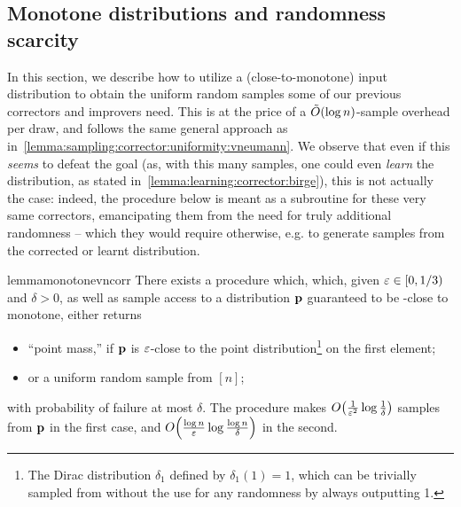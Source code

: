 \subsection{Monotone distributions and randomness scarcity}\label{sec:monotonicity:extract}
		In this section, we describe how to utilize a (close-to-monotone) input distribution to obtain the uniform random samples some of our previous correctors and improvers need. This is at the price of a $\tildeO{\log n}$-sample overhead per draw, and follows the same general approach as in~\cref{lemma:sampling:corrector:uniformity:vneumann}. We observe that even if this \emph{seems} to defeat the goal (as, with this many samples, one could even \emph{learn} the distribution, as stated in~\cref{lemma:learning:corrector:birge}), this is not actually the case: indeed, the procedure below is meant as a subroutine for these very same correctors, emancipating them from the need for truly additional randomness -- which they would require otherwise, e.g. to generate samples from the corrected or learnt distribution.
\begin{restatable}{lemma}{monotonevncorr}\label{lemma:randomness:monotone:vneumann}
  There exists a procedure which, which, given $\varepsilon\in[0,1/3)$ and $\delta > 0$, as well as sample access to a distribution $\mathbf{p}$ guaranteed to be \eps-close to monotone, either returns
  \begin{itemize}
    \item \textsf{``point mass,''} if $\mathbf{p}$ is $\varepsilon$-close to the point distribution\footnote{The Dirac distribution $\delta_1$ defined by $\delta_1(1)=1$, which can be trivially sampled from without the use for any randomness by always outputting 1.}  on the first element;
    \item or a uniform random sample from $[n]$;
  \end{itemize}
   with probability of failure at most $\delta$. The procedure makes $\bigO{\frac{1}{\eps^2} \log\frac{1}{\delta}}$ samples from $\mathbf{p}$ in the first case, and $\bigO{\frac{\log n}{\eps} \log\frac{\log n}{\delta}}$ in the second.
\end{restatable}
